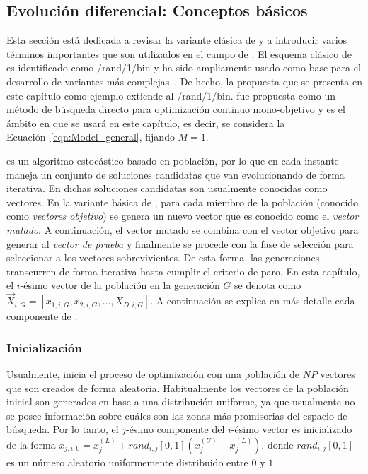 \subsection{Evolución diferencial: Conceptos básicos}

Esta sección está dedicada a revisar la variante clásica de \DE{} y a introducir varios términos importantes que son utilizados 
en el campo de \DE{}.
%
El esquema clásico de \DE{} es identificado como \DE{}/rand/1/bin y ha sido ampliamente usado como base para el desarrollo de 
variantes más complejas~\cite{das2011differential}.
%
De hecho, la propuesta que se presenta en este capítulo como ejemplo extiende al \DE{}/rand/1/bin.
%
\DE{} fue propuesta como un método de búsqueda directo para optimización continuo mono-objetivo y es el ámbito en que
se usará en este capítulo, es decir, se considera la Ecuación~\ref{eqn:Model_general}, fijando $M = 1$.

\DE{} es un algoritmo estocástico basado en población, por lo que en cada instante maneja un conjunto de soluciones 
candidatas que van evolucionando de forma iterativa.
%
En \DE{} dichas soluciones candidatas son usualmente conocidas como vectores.
%
En la variante básica de \DE{}, para cada miembro de la población (conocido como \textit{vectores objetivo}) 
se genera un nuevo vector que es conocido como el \textit{vector mutado}.
%
A continuación, el vector mutado se combina con el vector objetivo para generar al \textit{vector de prueba} y 
finalmente se procede con la fase de selección para seleccionar a los vectores sobrevivientes.
%
De esta forma, las generaciones transcurren de forma iterativa hasta cumplir el criterio de paro.
%
En esta capítulo, el $i$-ésimo vector de la población en la generación $G$ se denota como$\vec{X}_{i,G} = [x_{1,i,G}, x_{2,i,G},..., X_{D,i, G}]$.
%
A continuación se explica en más detalle cada componente de \DE{}.

\subsubsection{Inicialización}

Usualmente, \DE{} inicia el proceso de optimización con una población de $NP$ vectores que son creados de forma aleatoria.
%
Habitualmente los vectores de la población inicial son generados en base a una distribución uniforme, ya que usualmente no se posee 
información sobre cuáles son las zonas más promisorias del espacio de búsqueda.
%
Por lo tanto, el $j$-ésimo componente del $i$-ésimo vector es inicializado de la forma $x_{j,i,0} = x_{j}^{(L)} + rand_{i,j}[0,1] (x_{j}^{(U)} - x_{j}^{(L)})$,
donde $rand_{i,j}[0,1]$ es un número aleatorio uniformemente distribuido entre $0$ y $1$.

